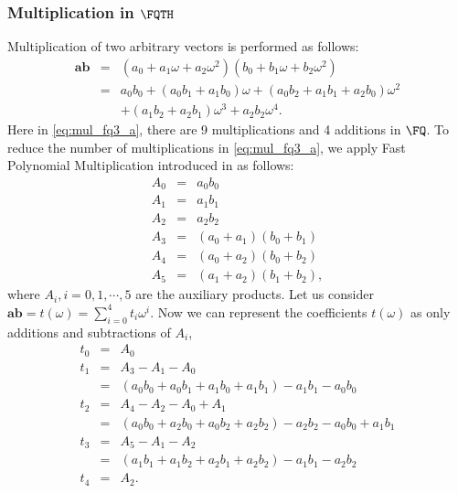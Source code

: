 \subsubsection{Multiplication in $\FQTH$}
Multiplication of two arbitrary vectors is performed as follows:
\begin{eqnarray}
\textbf{ab} & = & (a_0 + a_1\omega+ a_2\omega^2)(b_0 + b_1\omega+ b_2\omega^2)\nonumber\\
& = & a_0 b_0 + (a_0 b_1+a_1 b_0)\omega + (a_0 b_2 +a_1 b_1 + a_2 b_0)\omega^2 \nonumber \\ 
&  & + (a_1 b_2+a_2 b_1)\omega^3 +a_2b_2\omega^4.  \label{eq:mul_fq3_a}
\end{eqnarray}
Here in \eqref{eq:mul_fq3_a}, there are 9 multiplications and 4 additions in $\FQ$. To reduce the number of multiplications in \eqref{eq:mul_fq3_a}, we apply Fast Polynomial Multiplication introduced in \cite{JC:BaiPaa01} as follows:
\begin{eqnarray}\label{eq:FPM}
A_0 & = & a_0b_0\nonumber \\
A_1 & = & a_1b_1\nonumber \\
A_2 & = & a_2b_2\nonumber \\
A_3 & = & (a_0+ a_1)(b_0+b_1)\nonumber \\
A_4 & = & (a_0+ a_2)(b_0+b_2)\nonumber \\
A_5 & = & (a_1+ a_2)(b_1+b_2), 
\end{eqnarray}
where $A_i, i= 0,1, \cdots, 5$ are the auxiliary products. Let us consider $\textbf{ab} = t(\omega) = \sum_{i=0}^{4} t_i\omega^i$.
Now we can represent the coefficients $t(\omega)$ as only additions and subtractions of  $A_i$,
\begin{eqnarray}\label{eq:FPM1}
t_0 & = & A_0\nonumber \\
t_1 & = & A_3 - A_1 - A_0 \nonumber \\
& = & (a_0b_0 +a_0b_1+a_1b_0+a_1b_1)-a_1b_1-a_0b_0 \nonumber \\
t_2 & = & A_4 - A_2 - A_0 + A_1\nonumber \\
& = & (a_0b_0 +a_2b_0+a_0b_2+a_2b_2)-a_2b_2-a_0b_0 +a_1b_1\nonumber \\
t_3 & = & A_5 - A_1 - A_2\nonumber \\
& = & (a_1b_1 +a_1b_2+a_2b_1+a_2b_2)-a_1b_1-a_2b_2 \nonumber \\
t_4 & = & A_2.
\end{eqnarray}
